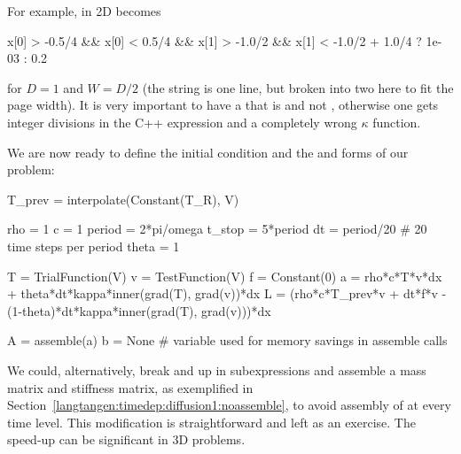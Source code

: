For example, in 2D  becomes
\begin{progoutput}
x[0] > -0.5/4 && x[0] < 0.5/4 && x[1] > -1.0/2 &&
x[1] < -1.0/2 + 1.0/4 ? 1e-03 : 0.2
\end{progoutput}
for $D=1$ and $W=D/2$ (the string is one line, but broken into two here
to fit the page width). It is very important to have a  that is
 and not , otherwise one gets integer divisions in
the C++ expression and a completely wrong $\kappa$ function.

We are now ready to define the initial condition and the  and
 forms of our problem:
\begin{python}
T_prev = interpolate(Constant(T_R), V)

rho = 1
c = 1
period = 2*pi/omega
t_stop = 5*period
dt = period/20  # 20 time steps per period
theta = 1

T = TrialFunction(V)
v = TestFunction(V)
f = Constant(0)
a = rho*c*T*v*dx + theta*dt*kappa*inner(grad(T), grad(v))*dx
L = (rho*c*T_prev*v + dt*f*v -
     (1-theta)*dt*kappa*inner(grad(T), grad(v)))*dx

A = assemble(a)
b = None  # variable used for memory savings in assemble calls
\end{python}
We could, alternatively, break  and  up in subexpressions
and assemble a mass matrix and stiffness matrix, as exemplified in
Section~\ref{langtangen:timedep:diffusion1:noassemble}, to avoid assembly
of  at every time level. This modification is straightforward
and left as an exercise. The speed-up can be significant in 3D problems.

